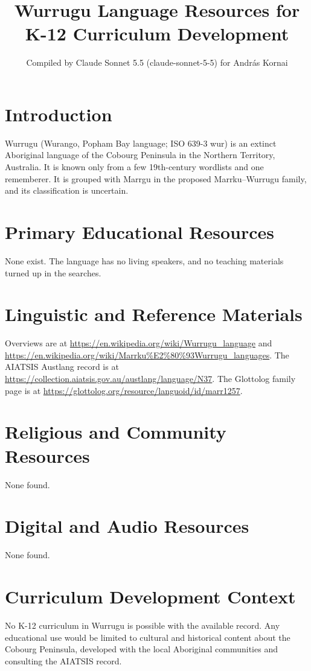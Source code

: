 \documentclass[12pt]{article}
\title{Wurrugu Language Resources for K-12 Curriculum Development}
\author{Compiled by Claude Sonnet 5.5 (claude-sonnet-5-5) for Andr\'as Kornai}
\date{}
\begin{document}
\maketitle

\section{Introduction}
Wurrugu (Wurango, Popham Bay language; ISO 639-3 wur) is an extinct Aboriginal language of the Cobourg Peninsula in the Northern Territory, Australia. It is known only from a few 19th-century wordlists and one rememberer. It is grouped with Marrgu in the proposed Marrku--Wurrugu family, and its classification is uncertain.

\section{Primary Educational Resources}
None exist. The language has no living speakers, and no teaching materials turned up in the searches.

\section{Linguistic and Reference Materials}
Overviews are at \url{https://en.wikipedia.org/wiki/Wurrugu_language} and \url{https://en.wikipedia.org/wiki/Marrku%E2%80%93Wurrugu_languages}. The AIATSIS Austlang record is at \url{https://collection.aiatsis.gov.au/austlang/language/N37}. The Glottolog family page is at \url{https://glottolog.org/resource/languoid/id/marr1257}.

\section{Religious and Community Resources}
None found.

\section{Digital and Audio Resources}
None found.

\section{Curriculum Development Context}
No K-12 curriculum in Wurrugu is possible with the available record. Any educational use would be limited to cultural and historical content about the Cobourg Peninsula, developed with the local Aboriginal communities and consulting the AIATSIS record.
\end{document}

